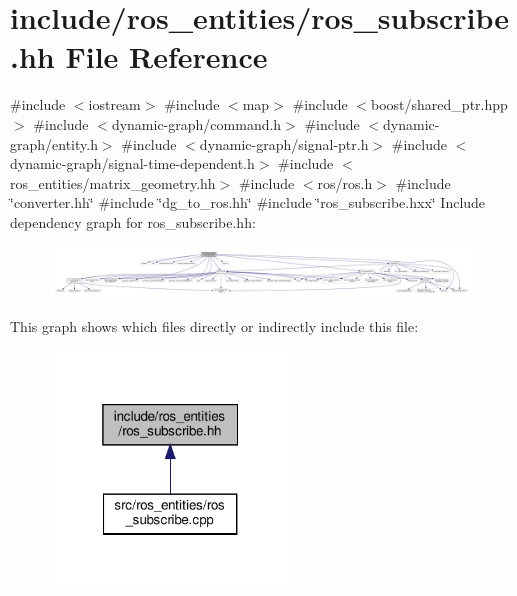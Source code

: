 \hypertarget{ros__subscribe_8hh}{}\section{include/ros\+\_\+entities/ros\+\_\+subscribe.hh File Reference}
\label{ros__subscribe_8hh}
{\ttfamily \#include $<$iostream$>$}\newline
{\ttfamily \#include $<$map$>$}\newline
{\ttfamily \#include $<$boost/shared\+\_\+ptr.\+hpp$>$}\newline
{\ttfamily \#include $<$dynamic-\/graph/command.\+h$>$}\newline
{\ttfamily \#include $<$dynamic-\/graph/entity.\+h$>$}\newline
{\ttfamily \#include $<$dynamic-\/graph/signal-\/ptr.\+h$>$}\newline
{\ttfamily \#include $<$dynamic-\/graph/signal-\/time-\/dependent.\+h$>$}\newline
{\ttfamily \#include $<$ros\+\_\+entities/matrix\+\_\+geometry.\+hh$>$}\newline
{\ttfamily \#include $<$ros/ros.\+h$>$}\newline
{\ttfamily \#include \char`\"{}converter.\+hh\char`\"{}}\newline
{\ttfamily \#include \char`\"{}dg\+\_\+to\+\_\+ros.\+hh\char`\"{}}\newline
{\ttfamily \#include \char`\"{}ros\+\_\+subscribe.\+hxx\char`\"{}}\newline
Include dependency graph for ros\+\_\+subscribe.\+hh\+:
\nopagebreak
\begin{figure}[H]
\begin{center}
\leavevmode
\includegraphics[width=350pt]{ros__subscribe_8hh__incl}
\end{center}
\end{figure}
This graph shows which files directly or indirectly include this file\+:
\nopagebreak
\begin{figure}[H]
\begin{center}
\leavevmode
\includegraphics[width=181pt]{ros__subscribe_8hh__dep__incl}
\end{center}
\end{figure}
